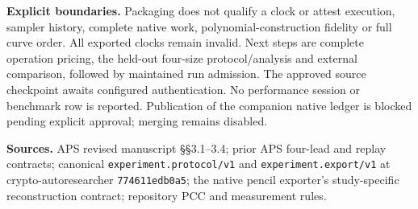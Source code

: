 \documentclass[10pt]{article}
\begin{document}
\medskip
\noindent\textbf{Explicit boundaries.}
Packaging does not qualify a clock or attest execution, sampler history,
complete native work, polynomial-construction fidelity or full curve order.
All exported clocks remain invalid. Next steps are complete operation pricing,
the held-out four-size protocol/analysis and external comparison, followed by
maintained run admission. The approved source checkpoint awaits configured
authentication. No performance session or benchmark row is reported.
Publication of the companion native ledger is blocked pending explicit
approval; merging remains disabled.

\medskip
\noindent\textbf{Sources.}
APS revised manuscript \S\S3.1--3.4; prior APS four-lead and replay contracts;
canonical \texttt{experiment.protocol/v1} and \texttt{experiment.export/v1} at
crypto-autoresearcher \texttt{774611edb0a5}; the native pencil exporter's
study-specific reconstruction contract; repository PCC and measurement rules.
\end{document}
